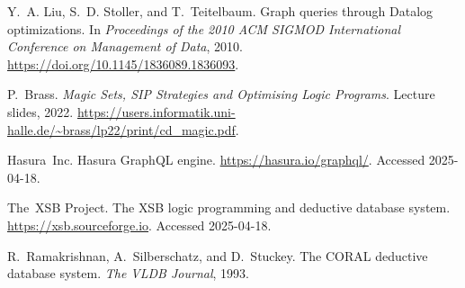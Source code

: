 \documentclass[11pt]{article}
\begin{document}

\begin{thebibliography}{10}\small

Y.~A. Liu, S.~D. Stoller, and T.~Teitelbaum.
\newblock Graph queries through Datalog optimizations.
\newblock In \emph{Proceedings of the 2010 ACM SIGMOD International Conference
  on Management of Data}, 2010.
  \url{https://doi.org/10.1145/1836089.1836093}.

P.~Brass.
\newblock \emph{Magic Sets, SIP Strategies and Optimising Logic Programs}.
\newblock Lecture slides, 2022.
\newblock \url{https://users.informatik.uni-halle.de/~brass/lp22/print/cd_magic.pdf}.

Hasura~Inc.
\newblock Hasura GraphQL engine.
\newblock \url{https://hasura.io/graphql/}. Accessed 2025-04-18.

The~XSB Project.
\newblock The {XSB} logic programming and deductive database system.
\newblock \url{https://xsb.sourceforge.io}. Accessed 2025-04-18.

R.~Ramakrishnan, A.~Silberschatz, and D.~Stuckey.
\newblock The {CORAL} deductive database system.
\newblock \emph{The VLDB Journal}, 1993.

\end{thebibliography}
\end{document}
